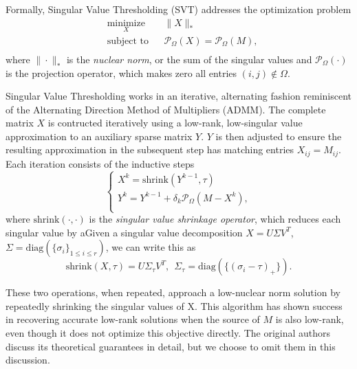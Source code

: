 Formally, Singular Value Thresholding (SVT) addresses the optimization
problem
\begin{equation*}
\begin{aligned}
  & \underset{X}{\text{minimize}} & & \|X\|_{*} \\
  & \text{subject to}             & & \mathcal{P}_\Omega (X) =
  \mathcal{P}_\Omega (M), \\
\end{aligned}
\end{equation*}
where $\|\cdot\|_{*}$ is the \emph{nuclear norm}, or the sum of the
singular values and $\mathcal{P}_\Omega (\cdot)$ is the projection
operator, which makes zero all entries $(i, j) \notin \Omega$.

Singular Value Thresholding works in an iterative, alternating fashion
reminiscent of the Alternating Direction Method of Multipliers (ADMM).
The complete matrix $X$ is contructed iteratively using a low-rank,
low-singular value approximation to an auxiliary sparse matrix $Y$.
$Y$ is then adjusted to ensure the resulting approximation in the
subsequent step has matching entries $X_{ij} = M_{ij}$. Each iteration
consists of the inductive steps
\begin{equation*}
\begin{cases}
X^{k} = \mathrm{shrink}(Y^{k-1}, \tau) \\
Y^{k} = Y^{k-1} + \delta_k \mathcal{P}_\Omega (M-X^{k}),              \\
\end{cases}
\end{equation*}
where $\mathrm{shrink}(\cdot, \cdot)$ is the \emph{singular value
  shrinkage operator}, which reduces each singular value by aGiven a
singular value decomposition $X = U \Sigma V^T$,
$\Sigma = \mathrm{diag}(\{\sigma_i\}_{1 \le i \le r})$, we can write
this as
\begin{equation*}
\mathrm{shrink}(X, \tau) = U\Sigma_\tau V^T, \ \ \Sigma_\tau = \mathrm{diag}(\{(\sigma_i-\tau)_{+}\}).
\end{equation*}


These two operations, when repeated, approach a low-nuclear norm
solution by repeatedly shrinking the singular values of X. This
algorithm has shown success in recovering accurate low-rank solutions
when the source of $M$ is also low-rank, even though it does not
optimize this objective directly. The original authors discuss its
theoretical guarantees in detail, but we choose to omit them in this
discussion.

